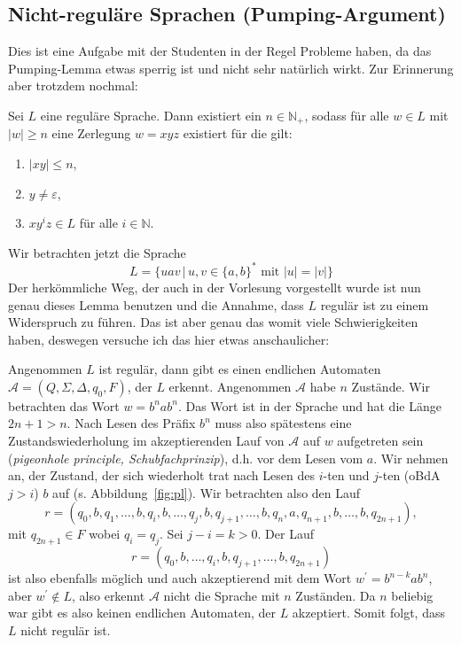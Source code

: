 \documentclass[11pt, a4paper]{article}
\begin{document}
\subsection*{Nicht-reguläre Sprachen (Pumping-Argument)}
Dies ist eine Aufgabe mit der Studenten in der Regel Probleme haben, da das Pumping-Lemma etwas sperrig ist und nicht sehr natürlich wirkt. Zur Erinnerung aber trotzdem nochmal:\par
Sei \( L \) eine reguläre Sprache. Dann existiert ein \( n \in \mathbb{N}_+ \), sodass für alle \( w \in L \) mit \( \left| w \right| \geq n \) eine Zerlegung \( w = xyz \) existiert für die gilt:
\begin{enumerate}
	\item \( \left| xy \right| \leq n \),
	\item \( y \neq \varepsilon \),
	\item \( xy^i z \in L \) für alle \( i \in \mathbb{N} \).
\end{enumerate}
Wir betrachten jetzt die Sprache 
\[
	L = \{ uav \,\vert\, u, v \in \{ a, b \}^\ast \text{ mit } \left| u \right| = \left| v \right| \} 
\]
Der herkömmliche Weg, der auch in der Vorlesung vorgestellt wurde ist nun genau dieses Lemma benutzen und die Annahme, dass \( L \) regulär ist zu einem Widerspruch zu führen. Das ist aber genau das womit viele Schwierigkeiten haben, deswegen versuche ich das hier etwas anschaulicher:\par
Angenommen \( L \) ist regulär, dann gibt es einen endlichen Automaten \( \mathcal{A} = (Q, \Sigma, \Delta, q_0, F) \), der \( L \) erkennt. Angenommen \( \mathcal{A} \) habe \( n \) Zustände. Wir betrachten das Wort \( w = b^n a b^n \). Das Wort ist in der Sprache und hat die Länge \( 2n+1 > n \). Nach Lesen des Präfix \( b^n \) muss also spätestens eine Zustandswiederholung im akzeptierenden Lauf von \( \mathcal{A} \) auf \( w \) aufgetreten sein (\textit{pigeonhole principle, Schubfachprinzip}), d.h. vor dem Lesen vom \( a \). Wir nehmen an, der Zustand, der sich wiederholt trat nach Lesen des \(i\)-ten und \(j\)-ten (oBdA \( j > i \)) \( b \) auf (s. Abbildung~\ref{fig:pl}). Wir betrachten also den Lauf
\[
	r = (q_0, b,  q_1, \ldots, b, q_i, b, \ldots, q_j, b, q_{j+1}, \ldots, b, q_n, a, q_{n+1}, b, \ldots, b, q_{2n+1}),
\]
mit \( q_{2n+1} \in F \) wobei \( q_i = q_j \). Sei \( j-i = k > 0 \). Der Lauf 
\[
	r = (q_0, b, \ldots, q_i, b, q_{j+1}, \ldots, b, q_{2n+1})
\]
ist also ebenfalls möglich und auch akzeptierend mit dem Wort \( w^\prime = b^{n-k}ab^n \), aber \( w^\prime \notin L \), also erkennt \( \mathcal{A} \) nicht die Sprache mit \( n \) Zuständen. Da \( n \) beliebig war gibt es also keinen endlichen Automaten, der \( L \) akzeptiert. Somit folgt, dass \( L \) nicht regulär ist.\par
\end{document}
